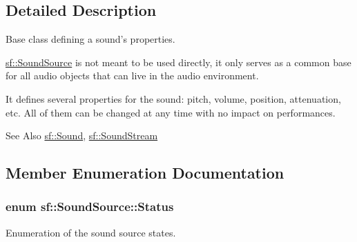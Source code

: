\subsection{Detailed Description}
Base class defining a sound's properties. 

\hyperlink{classsf_1_1_sound_source}{sf\-::\-Sound\-Source} is not meant to be used directly, it only serves as a common base for all audio objects that can live in the audio environment.

It defines several properties for the sound\-: pitch, volume, position, attenuation, etc. All of them can be changed at any time with no impact on performances.

\begin{DoxySeeAlso}{See Also}
\hyperlink{classsf_1_1_sound}{sf\-::\-Sound}, \hyperlink{classsf_1_1_sound_stream}{sf\-::\-Sound\-Stream} 
\end{DoxySeeAlso}


\subsection{Member Enumeration Documentation}
\hypertarget{classsf_1_1_sound_source_ac43af72c98c077500b239bc75b812f03}{
\subsubsection[{Status}]{\setlength{\rightskip}{0pt plus 5cm}enum {\bf sf\-::\-Sound\-Source\-::\-Status}}}\label{classsf_1_1_sound_source_ac43af72c98c077500b239bc75b812f03}


Enumeration of the sound source states. 

